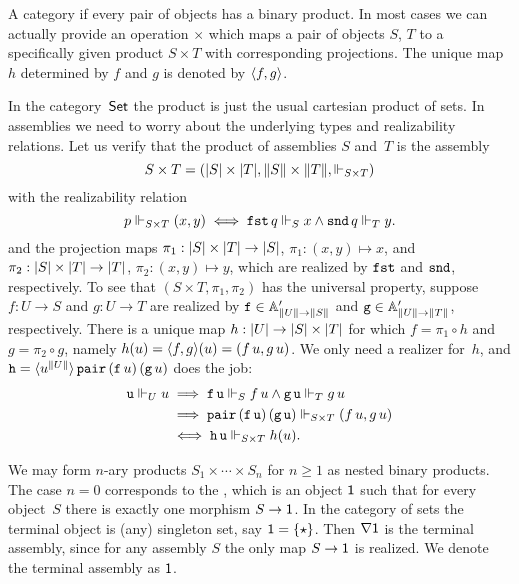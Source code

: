 A category  if every pair of objects has a
binary product. In most cases we can actually provide an operation
$\times$ which maps a pair of objects $S$, $T$ to a specifically given
product $S \times T$ with corresponding projections. The unique map
$h$ determined by $f$ and $g$ is denoted by $\pair{f,g}$.

In the category~$\Set$ the product is just the usual cartesian product
of sets. In assemblies we need to worry about the underlying types and
realizability relations. Let us verify that the product of assemblies
$S$ and~$T$ is the assembly
%
\begin{equation*}
  S \times T =
  (\S{S} \times \S{T}, \T{S} \times \T{T}, {\rz[S \times T]})
\end{equation*}
%
with the realizability relation
%
\begin{equation*}
  p \rz[S \times T] (x,y)
  \iff
  \combFst\,q \rz[S] x
  \land
  \combSnd\,q \rz[T] y.
\end{equation*}
%
and the projection maps $\pi_1 : \S{S} \times \S{T} \to \S{S}$, $\pi_1 : (x,y)
\mapsto x$, and $\pi_2 : \S{S} \times \S{T} \to \S{T}$, $\pi_2 : (x,y) \mapsto y$,
which are realized by $\combFst$ and $\combSnd$, respectively.
%
To see that $(S \times T, \pi_1, \pi_2)$ has the universal
property, suppose $f : U \to S$ and $g : U \to
T$ are realized by $\R{f} \in \subAtyp{\T{U} \to \T{S}}$ and $\R{g}
\in \subAtyp{\T{U} \to \T{T}}$, respectively. There is a unique map $h :
\S{U} \to \S{S} \times \S{T}$ for which $f = \pi_1 \circ h$ and $g = \pi_2 \circ g$,
namely $h(u) = \pair{f,g}(u) = (f\,u, g\,u)$. We only need a realizer
for~$h$, and $\R{h} =
\tpcalam{u}{\T{U}}{\combPair\,(\R{f}\,u)\,(\R{g}\,u)}$ does the
job:
%
\begin{align*}
  \R{u} \rz[U] u
  &\implies
  \R{f}\,\R{u} \rz[S] f\,u
  \land
  \R{g}\,\R{u} \rz[T] g\,u \\
  &\implies
  \combPair\, (\R{f}\,\R{u})\, (\R{g}\,\R{u}) \rz[S \times T] (f\,u, g\,u) \\
  &\iff
  \R{h}\,\R{u} \rz[S \times T] h(u).
\end{align*}

We may form $n$-ary products $S_1 \times \cdots \times S_n$ for $n \geq 1$ as nested binary products. The case $n = 0$ corresponds to the ,
which is an object $\one$ such that for every object~$S$ there is exactly one morphism $S \to \one$. In the category of sets the terminal object is (any) singleton set, say $\one = \set{\star}$. Then $\nabla \one$ is the terminal assembly, since for any assembly
$S$ the only map $S \to \one$ is realized. We denote the terminal assembly as $\one$.

